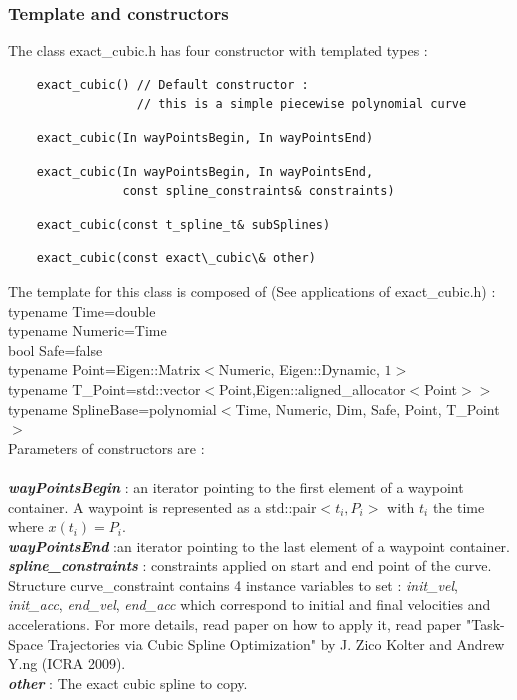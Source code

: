 \documentclass{article}
\begin{document}
    \subsubsection{Template and constructors}
    
    The class exact\_cubic.h has four constructor with templated types :\\
    \begin{lstlisting}
    exact_cubic() // Default constructor :
                  // this is a simple piecewise polynomial curve
    \end{lstlisting}
    \begin{lstlisting}
    exact_cubic(In wayPointsBegin, In wayPointsEnd)
    \end{lstlisting}
    \begin{lstlisting}
    exact_cubic(In wayPointsBegin, In wayPointsEnd, 
                const spline_constraints& constraints)
    \end{lstlisting}
    \begin{lstlisting}
    exact_cubic(const t_spline_t& subSplines)
    \end{lstlisting}
    \begin{lstlisting}
    exact_cubic(const exact\_cubic\& other)
    \end{lstlisting}
    
    \noindent
    The template for this class is composed of (See applications of exact\_cubic.h) :\\ 
    typename Time=double\\
    typename Numeric=Time\\
    bool Safe=false\\
    typename Point=Eigen::Matrix$<$Numeric, Eigen::Dynamic, $1>$\\
    typename T\_Point=std::vector$<$Point,Eigen::aligned\_allocator$<$Point$> >$\\
    typename SplineBase=polynomial$<$Time, Numeric, Dim, Safe, Point, T\_Point$>$\\
    
    Parameters of constructors are :\\\\
    \textbf{\textit{wayPointsBegin}} : an iterator pointing to the first element of a waypoint container. A waypoint is represented as a std::pair$<t_i, P_i>$ with $t_i$ the time where $x(t_i)=P_i$.\\
    \textbf{\textit{wayPointsEnd}} :an iterator pointing to the last element of a waypoint container.\\
    \textbf{\textit{spline\_constraints}} : constraints applied on start and end point of the curve.\\
    Structure curve\_constraint contains 4 instance variables to set : \textit{init\_vel}, \textit{init\_acc}, \textit{end\_vel}, \textit{end\_acc} which correspond to initial and final velocities and accelerations. For more details, read paper on how to apply it, read paper "Task-Space Trajectories via Cubic Spline Optimization" by J. Zico Kolter and Andrew Y.ng (ICRA 2009).\\
    \textbf{\textit{other}} : The exact cubic spline to copy.\\\\
    
\end{document}
